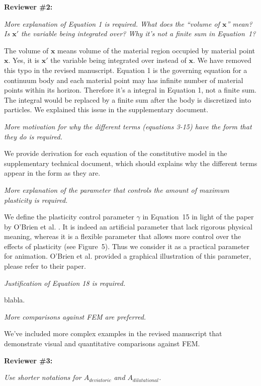 \noindent{}\textbf{Reviewer \#2:}

\emph{More explanation of Equation 1 is required. What does the ``volume of $\mathbf{x}$'' mean? Is $\mathbf{x}'$ the variable being integrated over? Why it's not a finite sum in Equation~1?}

The volume of $\mathbf{x}$ means volume of the material region occupied by material point $\mathbf{x}$. Yes, it is $\mathbf{x}'$ the variable being integrated over instead of $\mathbf{x}$. We have removed this typo in the revised manuscript. Equation 1 is the governing equation for a continuum body and each material point may has infinite number of material points within its horizon. Therefore it's a integral in Equation 1, not a finite sum. The integral would be replaced by a finite sum after the body is discretized into particles. We explained this issue in the supplementary document.

\emph{More motivation for why the different terms (equations 3-15) have the form that they do is required.}

We provide derivation for each equation of the constitutive model in the supplementary technical document, which should explains why the different terms appear in the form as they are.

\emph{More explanation of the parameter that controls the amount of maximum plasticity is required.}

We define the plasticity control parameter $\gamma$ in Equation~15 in light of the paper by O'Brien et al. \cite{O'Brien:2002:GMA:566654.566579}. It is indeed an artificial parameter that lack rigorous physical meaning, whereas it is a flexible parameter that allows more control over the effects of plasticity (see Figure~5). Thus we consider it as a practical parameter for animation. O'Brien et al. \cite{O'Brien:2002:GMA:566654.566579} provided a graphical illustration of this parameter, please refer to their paper.

\emph{Justification of Equation 18 is required.}

blabla.

\emph{More comparisons against FEM are preferred.}

We've included more complex examples in the revised manuscript that demonstrate visual and quantitative comparisons against FEM.

\noindent{}\textbf{Reviewer \#3:}

\emph{Use shorter notations for $A_{deviatoric}$ and $A_{dilatational}$.}

